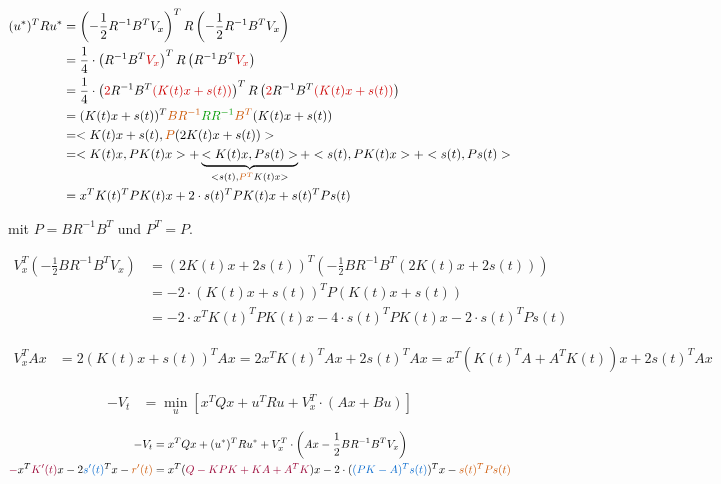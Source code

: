 \documentclass[a4paper, 12pt]{scrartcl}
\newcommand{\rot}[2][rot]{\textcolor{#1}{#2}}
\newcommand{\gruen}[2][gruen]{\textcolor{#1}{#2}}
\newcommand{\orange}[2][orange]{\textcolor{#1}{#2}}
\newcommand{\blau}[2][blau]{\textcolor{#1}{#2}}
\newcommand{\dunkelrot}[2][dunkelrot]{\textcolor{#1}{#2}}
\begin{document}
\begin{align*}
(u^{*})^T R u^{*} 
&=  \left(- \frac{1}{2} R^{-1} B^T V_x \right)^T R \left(- \frac{1}{2} R^{-1} B^T V_x \right) \\
&= \frac{1}{4} \cdot \left( R^{-1} B^T \rot{V_x} \right)^T R \left( R^{-1} B^T \rot{V_x} \right) \\
&= \frac{1}{4} \cdot \left(\rot{2} R^{-1} B^T \rot{(K(t)x + s(t))} \right)^T R \left( \rot{2} R^{-1} B^T \rot{(K(t)x + s(t))} \right) \\
&=  (K(t)x + s(t))^T \orange{B R^{-1}} \gruen{ R R^{-1}} \orange{B^T} (K(t)x + s(t)) \\
&=    < K(t)x + s(t) , \orange{P} (2K(t)x + s(t)) >  \\
&=  < K(t)x, P K(t)x > +  \underbrace{< K(t)x, Ps(t) >}_{< s(t),  \orange{P^{T}} K(t)x  >} + < s(t), P K(t)x  > + <s(t), P s(t) >  \\
&= x^T K(t)^T P K(t)x + 2 \cdot s(t)^T P K(t) x +  s(t)^T P s(t)
\end{align*}

mit $P = B R^{-1} B^T$ und $P^T = P$.  
%

\begin{align*}
V_x^{T}  \left( - \frac{1}{2} B R^{-1} B^T V_x \right)
&= (2K(t)x +2s(t))^T \left( - \frac{1}{2} B R^{-1} B^T (2K(t)x +2s(t)) \right) \\
&= -2 \cdot (K(t)x + s(t))^T P (K(t)x + s(t)) \\
&= -2 \cdot x^T K(t)^T P K(t)x -4 \cdot s(t)^T P K(t)x -2 \cdot s(t)^T P s(t) 
\end{align*}

\begin{align*}
V_x^T Ax &= 2 (K(t)x + s(t))^T A x = 2 x^T K(t)^T A x + 2 s(t)^T Ax = x^T (K(t)^T A + A^T K(t) ) x + 2 s(t)^T Ax
\end{align*}


\begin{align*}
- V_t 	&= \min_u \left[ x^T Q x + u^T R u + V_x^T \cdot (Ax+Bu) \right] 
\end{align*}



\begin{align*}
- V_t 								&=  x^T Q x + (u^{*})^T R u^{*}  + V_x^T \cdot \left( Ax- \frac{1}{2} B R^{-1} B^T V_x \right) 
\\
\dunkelrot{-} x^T \dunkelrot{K'(t)} x - 2 \blau{s'(t)}^T x  -\orange{r'(t)} 	&= x^T (\dunkelrot{Q-KPK+ KA + A^T K}) x - 2 \cdot (\blau{(P K -A)^T s(t)})^T x - \orange{ s(t)^T P s(t)}
\end{align*}
\end{document}
